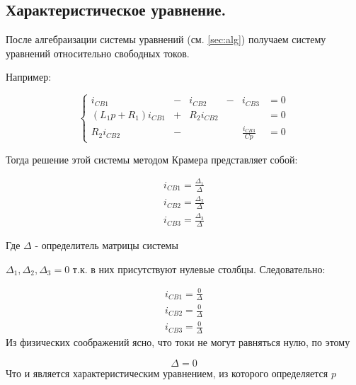 \subsection{Характеристическое уравнение.}


После алгебраизации системы уравнений (см. \ref{sec:alg}) получаем систему уравнений относительно свободных токов.

Например:

$$
\left\{\begin{matrix}
i_{CB1}& - &i_{CB2}& - &i_{CB3} & = 0 \\ 
(L_1 p + R_1)i_{CB1}& + & R_2 i_{CB2} && &=0 \\ 
R_2 i_{CB2}& - &&&\frac{i_{CB3}}{C p}  & = 0 
\end{matrix}\right.
$$


Тогда решение этой системы методом Крамера представляет собой:


\begin{eqnarray}
i_{CB1} = \frac{\Delta_1}{\Delta}\\
i_{CB2} = \frac{\Delta_2}{\Delta}\\
i_{CB3} = \frac{\Delta_3}{\Delta}
\end{eqnarray}

Где $\Delta $ - определитель матрицы системы

$\Delta_1 ,  \Delta_2, \Delta_3 = 0$ т.к. в них присутствуют нулевые столбцы.
Следовательно:

\begin{eqnarray}
i_{CB1} = \frac{0}{\Delta}\\
i_{CB2} = \frac{0}{\Delta}\\
i_{CB3} = \frac{0}{\Delta}
\end{eqnarray}
Из физических соображений ясно, что токи не могут равняться нулю, по этому

\begin{equation}
\Delta = 0
\end{equation}
Что и является характеристическим уравнением, из которого определяется $p$

\pagebreak
